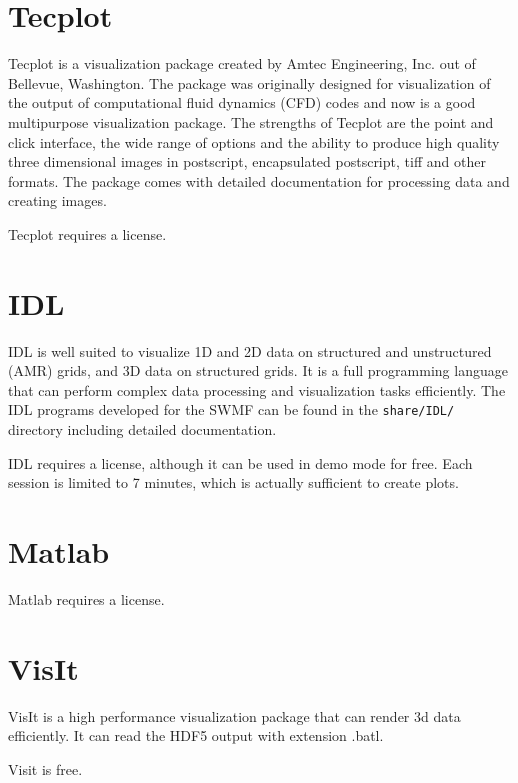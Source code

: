 \section{Tecplot}

Tecplot is a visualization package created by Amtec Engineering, Inc.
out of Bellevue, Washington.  The package was originally designed for
visualization of the output of computational fluid dynamics (CFD)
codes and now is a good multipurpose visualization package.  
The strengths of Tecplot are the point and click interface, the 
wide range of options and the ability to produce high quality
three dimensional images in postscript, encapsulated postscript, tiff
and other formats.  The package comes with detailed
documentation for processing data and creating images.

Tecplot requires a license.

\section{IDL}

IDL is well suited to visualize 1D and 2D data on structured and 
unstructured (AMR) grids, and 3D data on structured grids. 
It is a full programming language that can perform complex
data processing and visualization tasks efficiently.
The IDL programs developed for the SWMF can be found
in the {\tt share/IDL/} directory including detailed 
documentation.

IDL requires a license, although it can be used in demo mode
for free. Each session is limited to 7 minutes, which is 
actually sufficient to create plots.

\section{Matlab}

Matlab requires a license.

\section{VisIt}

VisIt is a high performance visualization package that
can render 3d data efficiently.
It can read the HDF5 output with extension .batl.

Visit is free.

